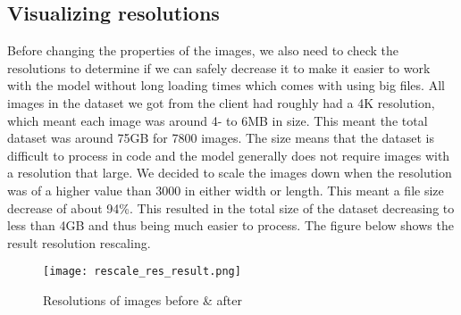 \newpage
\subsection{Visualizing resolutions}
\begin{fullwidth} %
Before changing the properties of the images, 
we also need to check the resolutions to determine if we can safely decrease it to make it easier to work with the model without long loading times which comes with using big files. 
All images in the dataset we got from the client had roughly had a 4K resolution, which meant each image was around 4- to 6MB in size. 
This meant the total dataset was around 75GB for 7800 images. 
The size means that the dataset is difficult to process in code and the model generally does not require images with a resolution that large. 
We decided to scale the images down when the resolution was of a higher value than 3000 in either width or length. 
This meant a file size decrease of about 94\%. 
This resulted in the total size of the dataset decreasing to less than 4GB and thus being much easier to process. 
The figure below shows the result resolution rescaling.
\end{fullwidth} %

\begin{figure}[H] %
	\texttt{[image: rescale\_res\_result.png]}
	\caption{Resolutions of images before \& after}
	\label{fig:rescale_res_result} %
\end{figure}


